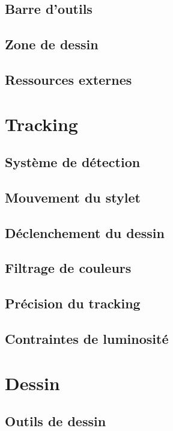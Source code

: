 \documentclass[11pt,a4paper,oldfontcommands]{memoir}
\begin{document}
\subsection{Barre d'outils}

\subsection{Zone de dessin}

\subsection{Ressources externes}

\section{Tracking}

\subsection{Système de détection}

\subsection{Mouvement du stylet}

\subsection{Déclenchement du dessin}

\subsection{Filtrage de couleurs}

\subsection{Précision du tracking}

\subsection{Contraintes de luminosité}

\newpage

\section{Dessin}

\subsection{Outils de dessin}
\end{document}
